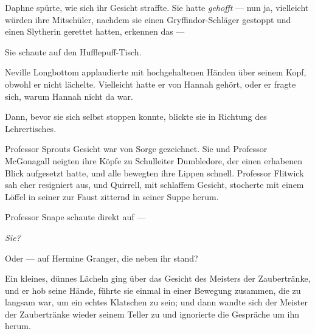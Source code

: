 Daphne spürte, wie sich ihr Gesicht straffte. Sie hatte \emph{gehofft} — nun ja, vielleicht würden ihre Mitschüler, nachdem sie einen Gryffindor-Schläger gestoppt und einen Slytherin gerettet hatten, erkennen das —

Sie schaute auf den Hufflepuff-Tisch.

Neville Longbottom applaudierte mit hochgehaltenen Händen über seinem Kopf, obwohl er nicht lächelte. Vielleicht hatte er von Hannah gehört, oder er fragte sich, warum Hannah nicht da war.

Dann, bevor sie sich selbst stoppen konnte, blickte sie in Richtung des Lehrertisches.

Professor Sprouts Gesicht war von Sorge gezeichnet. Sie und Professor McGonagall neigten ihre Köpfe zu Schulleiter Dumbledore, der einen erhabenen Blick aufgesetzt hatte, und alle bewegten ihre Lippen schnell. Professor Flitwick sah eher resigniert aus, und Quirrell, mit schlaffem Gesicht, stocherte mit einem Löffel in seiner zur Faust zitternd in seiner Suppe herum.

Professor Snape schaute direkt auf —

\emph{Sie?}

Oder — auf Hermine Granger, die neben ihr stand?

Ein kleines, dünnes Lächeln ging über das Gesicht des Meisters der Zaubertränke, und er hob seine Hände, führte sie einmal in einer Bewegung zusammen, die zu langsam war, um ein echtes Klatschen zu sein; und dann wandte sich der Meister der Zaubertränke wieder seinem Teller zu und ignorierte die Gespräche um ihn herum.

